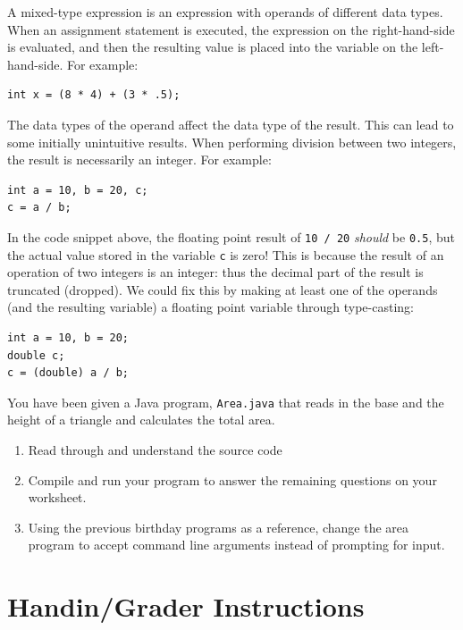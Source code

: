 \documentclass[12pt]{scrartcl}
\begin{document}
A mixed-type expression is an expression with operands of different 
data types. When an assignment statement is executed, the expression 
on the right-hand-side is evaluated, and then the resulting value is 
placed into the variable on the left-hand-side.  For example:

\begin{verbatim}
int x = (8 * 4) + (3 * .5);
\end{verbatim}

The data types of the operand affect the data type of the result.  This 
can lead to some initially unintuitive results.  When performing division 
between two integers, the result is necessarily an integer.  For example:

\begin{verbatim}
int a = 10, b = 20, c;
c = a / b;
\end{verbatim}

In the code snippet above, the floating point result of \texttt{10 / 20} 
\emph{should} be \texttt{0.5}, but the actual value stored in the 
variable \texttt{c} is zero!  This is because the result of an operation 
of two integers is an integer: thus the decimal part of the result is truncated 
(dropped).  We could fix this by making at least one of the operands (and 
the resulting variable) a floating point variable through type-casting:

\begin{verbatim}
int a = 10, b = 20;
double c;
c = (double) a / b;
\end{verbatim}

You have been given a Java program, \texttt{Area.java} that reads 
in the base and the height of a triangle and calculates the total area.

\begin{enumerate}
  \item Read through and understand the source code
  \item Compile and run your program to answer the remaining questions 
  	on your worksheet.
  \item Using the previous birthday programs as a reference, change the
  	area program to accept command line arguments instead of prompting
	for input.
\end{enumerate}  


\section{Handin/Grader Instructions}
\end{document}
